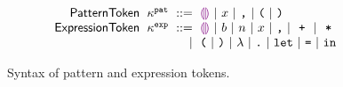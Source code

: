 \begin{figure}
  \vspace{-3px}
  \[
  \arraycolsep=3pt\begin{array}{rlrl}
      \mathsf{PatternToken} & \kappa^{\pat} & ::= &
        \shole ~\vert~
        \svar{x} ~\vert~
        \sprod{}{} ~\vert~
        \texttt{(} ~\vert~
        \texttt{)} \\
      \mathsf{ExpressionToken} & \kappa^{\expr} & ::= &
        \shole ~\vert~
        \sboollit{b} ~\vert~
        \snumlit{n} ~\vert~
        \svar{x} ~\vert~
        \sprod{}{} ~\vert~
        \splus{}{} ~\vert~
        \smult{}{} \\
      & & \vert &
        \texttt{(} ~\vert~
        \texttt{)} ~\vert~
        \lambda ~\vert~
        \texttt{.} ~\vert~
        \texttt{let} ~\vert~
        \texttt{=} ~\vert~
        \texttt{in}
  \end{array}\]
  \caption{
    Syntax of pattern and expression tokens.
  }
  \label{fig:language-syntax}
\end{figure}